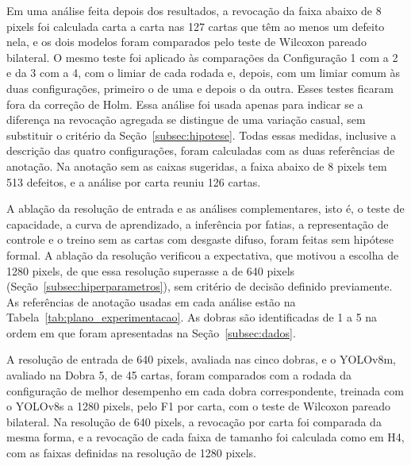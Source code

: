 \documentclass[
    12pt,                %
    openright,           %
    oneside,             %
    a4paper,             %
    english,             %
    brazil               %
]{abntex2}
\begin{document}
Em uma análise feita depois dos resultados, a revocação da
faixa abaixo de 8 pixels foi calculada carta a carta nas 127 cartas que
têm ao menos um defeito nela, e os dois modelos foram comparados pelo
teste de Wilcoxon pareado bilateral. O mesmo teste foi aplicado às
comparações da Configuração 1 com a 2 e da 3 com a 4, com o limiar de
cada rodada e, depois, com um limiar comum às duas configurações,
primeiro o de uma e depois o da outra. Esses testes ficaram fora da
correção de Holm. Essa análise
foi usada apenas para
indicar se a diferença na revocação agregada se distingue de uma variação
casual, sem substituir o critério da Seção~\ref{subsec:hipotese}. Todas
essas medidas, inclusive a descrição das quatro configurações, foram
calculadas com as duas referências de anotação. Na anotação sem as
caixas sugeridas, a faixa abaixo de 8 pixels tem 513 defeitos, e a
análise por carta reuniu 126 cartas.

A ablação da resolução de entrada e as análises complementares, isto
é, o teste de capacidade, a curva de aprendizado, a inferência por
fatias, a representação de controle e o treino sem as cartas com
desgaste difuso, foram feitas sem hipótese
formal. A ablação da resolução verificou a expectativa, que motivou a
escolha de 1280 pixels, de que essa resolução superasse a de 640 pixels
(Seção~\ref{subsec:hiperparametros}), sem critério de
decisão definido previamente. As referências de anotação usadas em
cada análise estão na Tabela~\ref{tab:plano_experimentacao}. As dobras são
identificadas de 1 a 5 na ordem em que foram apresentadas na Seção~\ref{subsec:dados}.

A resolução de entrada de 640 pixels, avaliada nas cinco dobras, e o
YOLOv8m, avaliado na Dobra 5, de 45 cartas, foram comparados com a
rodada da configuração de melhor desempenho em cada dobra
correspondente, treinada com o YOLOv8s a 1280 pixels, pelo F1 por
carta, com o teste de Wilcoxon pareado bilateral. Na resolução de 640
pixels, a revocação por carta foi comparada da mesma forma, e a
revocação de cada faixa de tamanho foi calculada como em H4, com as
faixas definidas na resolução de 1280 pixels.
\end{document}

